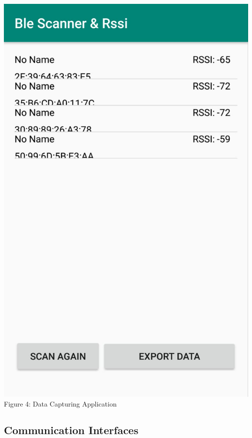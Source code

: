 \documentclass{article}
\begin{document}
\begin{center}

\includegraphics[scale=0.25]{hi}
\\Figure 4: Data Capturing Application
\end{center}

\subsection{Communication Interfaces}
\end{document}
